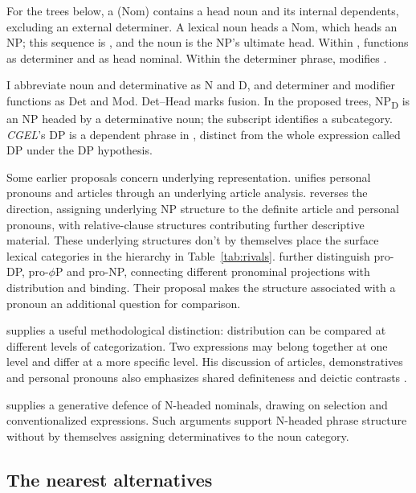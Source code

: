 \documentclass[12pt]{article}
\begin{document}
For the trees below, a  (Nom) contains a head noun and its internal dependents, excluding an external determiner. A lexical noun heads a Nom, which heads an NP; this sequence is , and the noun is the NP's ultimate head. Within ,  functions as determiner and  as head nominal. Within the determiner phrase,  modifies .

I abbreviate noun and determinative as N and D, and determiner and modifier functions as Det and Mod. Det--Head marks fusion. In the proposed trees, NP\textsubscript{D} is an NP headed by a determinative noun; the subscript identifies a subcategory. \textit{CGEL}'s DP is a dependent phrase in , distinct from the whole expression called DP under the DP hypothesis.

Some earlier proposals concern underlying representation. \textcite{postal1966} unifies personal pronouns and articles through an underlying article analysis. \textcite[197--203]{sommerstein1972} reverses the direction, assigning underlying NP structure to the definite article and personal pronouns, with relative-clause structures contributing further descriptive material. These underlying structures don't by themselves place the surface lexical categories in the hierarchy in Table~\ref{tab:rivals}. \textcite{dechainewiltschko2002} further distinguish pro-DP, pro-$\phi$P and pro-NP, connecting different pronominal projections with distribution and binding. Their proposal makes the structure associated with a pronoun an additional question for comparison.

\textcite[232--235]{lyons1968} supplies a useful methodological distinction: distribution can be compared at different levels of categorization. Two expressions may belong together at one level and differ at a more specific level. His discussion of articles, demonstratives and personal pronouns also emphasizes shared definiteness and deictic contrasts \citep[279]{lyons1968}.

\textcite{bruening2020nominal} supplies a generative defence of N-headed nominals, drawing on selection and conventionalized expressions. Such arguments support N-headed phrase structure without by themselves assigning determinatives to the noun category.

\subsection{The nearest alternatives}
\end{document}
